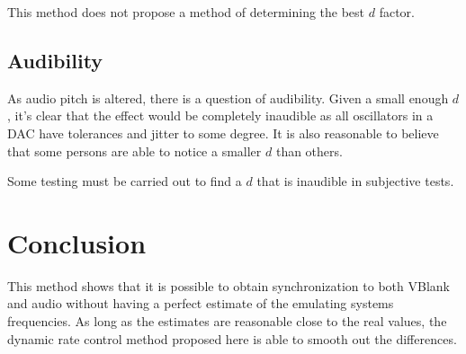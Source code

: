 \documentclass[11pt, a4paper]{article}
\begin{document}
This method does not propose a method of determining the best $d$ factor.

\subsection{Audibility}
As audio pitch is altered, there is a question of audibility. Given a small enough $d$, it's
clear that the effect would be completely inaudible as all oscillators in a DAC have tolerances and jitter to some degree. It is also reasonable to believe that some persons are able to notice a smaller $d$ than others.

Some testing must be carried out to find a $d$ that is inaudible in subjective tests.

\section{Conclusion}
This method shows that it is possible to obtain synchronization to both VBlank and audio without having a perfect estimate of the emulating systems frequencies. As long as the estimates are reasonable close to the real values, the dynamic rate control method proposed here is able to smooth out the differences.
\end{document}
